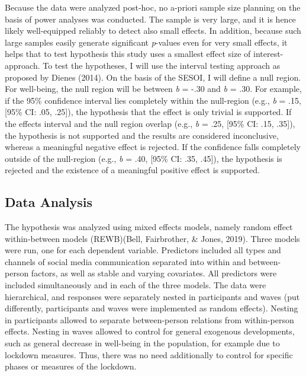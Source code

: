 \documentclass[
  english,
  man,mask,floatsintext]{apa6}
\begin{document}
Because the data were analyzed post-hoc, no a-priori sample size planning on the basis of power analyses was conducted.
The sample is very large, and it is hence likely well-equipped reliably to detect also small effects.
In addition, because such large samples easily generate significant \emph{p}-values even for very small effects, it helps that to test hypothesis this study uses a smallest effect size of interest-approach.
To test the hypotheses, I will use the interval testing approach as proposed by Dienes (2014).
On the basis of the SESOI, I will define a null region.
For well-being, the null region will be between \emph{b} = -.30 and \emph{b} = .30.
For example, if the 95\% confidence interval lies completely within the null-region (e.g., \emph{b} = .15, {[}95\% CI: .05, .25{]}), the hypothesis that the effect is only trivial is supported.
If the effects interval and the null region overlap (e.g., \emph{b} = .25, {[}95\% CI: .15, .35{]}), the hypothesis is not supported and the results are considered inconclusive, whereas a meaningful negative effect is rejected.
If the confidence falls completely outside of the null-region (e.g., \emph{b} = .40, {[}95\% CI: .35, .45{]}), the hypothesis is rejected and the existence of a meaningful positive effect is supported.

\hypertarget{data-analysis}{%
\subsection{Data Analysis}\label{data-analysis}}

The hypothesis was analyzed using mixed effects models, namely random effect within-between models (REWB)(Bell, Fairbrother, \& Jones, 2019).
Three models were run, one for each dependent variable.
Predictors included all types and channels of social media communication separated into within and between-person factors, as well as stable and varying covariates.
All predictors were included simultaneously and in each of the three models.
The data were hierarchical, and responses were separately nested in participants and waves (put differently, participants and waves were implemented as random effects).
Nesting in participants allowed to separate between-person relations from within-person effects.
Nesting in waves allowed to control for general exogenous developments, such as general decrease in well-being in the population, for example due to lockdown measures.
Thus, there was no need additionally to control for specific phases or measures of the lockdown.
\end{document}
